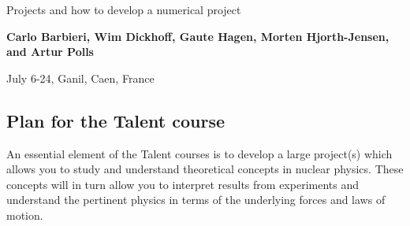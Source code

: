 \documentclass[%
twoside,                 %
final,                   %
10pt]{article}
\begin{document}






\thispagestyle{empty}

\begin{center}
{\LARGE\bf
\begin{spacing}{1.25}
Projects and how to develop a numerical project
\end{spacing}
}
\end{center}


\begin{center}
{\bf Carlo Barbieri, Wim Dickhoff, Gaute Hagen, Morten Hjorth-Jensen, and Artur Polls${}^{}$} \\ [0mm]
\end{center}

    \begin{center}
\end{center}
    

\begin{center} %
July 6-24, Ganil, Caen, France
\end{center}

\vspace{1cm}


\tableofcontents


\vspace{1cm} %




\subsection*{Plan for the Talent course}
An essential element of the Talent courses is to develop a large project(s) which allows you to study and understand
theoretical concepts in nuclear physics.  
These concepts will in turn allow you to interpret results from experiments and understand the pertinent physics in terms of the underlying forces and laws of motion.
\end{document}
